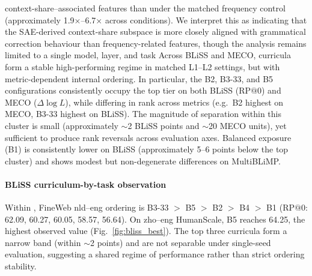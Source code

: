 context-share–associated features than under the matched frequency control (approximately 1.9×–6.7× across conditions). We interpret this as indicating that the SAE-derived context-share subspace is more closely aligned with grammatical correction behaviour than frequency-related features, though the analysis remains limited to a single model, layer, and task Across BLiSS and MECO, \beetle{} curricula form a stable high-performing regime in matched L1--L2 settings, but with metric-dependent internal ordering. In particular, the B2, B3-33, and B5 configurations consistently occupy the top tier on both BLiSS (RP$@0$) and MECO ($\Delta\log L$), while differing in rank across metrics (e.g.\ B2 highest on MECO, B3-33 highest on BLiSS). The magnitude of separation within this cluster is small (approximately $\sim$2 BLiSS points and $\sim$20 MECO units), yet sufficient to produce rank reversals across evaluation axes. Balanced exposure (B1) is consistently lower on BLiSS (approximately 5--6 points below the top cluster) and shows modest but non-degenerate differences on MultiBLiMP. \paragraph{BLiSS curriculum-by-task observation}\label{sec:discrim-bliss} Within \beetle{}, FineWeb nld--eng ordering is B3-33 $>$ B5 $>$ B2 $>$ B4 $>$ B1 (RP$@0$: 62.09, 60.27, 60.05, 58.57, 56.64). On zho--eng HumanScale, B5 reaches 64.25, the highest observed value (Fig.~\ref{fig:bliss_best}). The top three curricula form a narrow band (within $\sim$2 points) and are not separable under single-seed evaluation, suggesting a shared regime of performance rather than strict ordering stability. 









